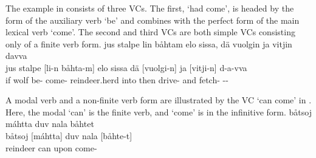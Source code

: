 The example in  consists of three VCs. The first,  ‘had come’, is headed by the  form of the auxiliary verb  ‘be’ and combines with the perfect form of the main lexical verb  ‘come’. The second and third VCs are both simple VCs consisting only of a finite verb form.
\ea\label{VCex4}
\glll	jus stalpe lin båhtam elo sissa, dä vuolgin ja vitjin davva\\
	jus stalpe [li-n {båhta-m]\subVC{}} elo sissa dä {[vuolgi-n]\subVC{}} ja {[vitji-n]\subVC{}} d-a-vva\\
	if wolf\BS{} be- come- reindeer.herd\BS{} into then drive- and fetch- --\\\nopagebreak
{}	
\z

A modal verb %
and a non-finite verb form are illustrated by the VC  ‘can come’ in . Here, the modal  ‘can’ is the finite verb, and  ‘come’ is in the infinitive form. 
\ea\label{VCex5}
\glll	båtsoj máhtta duv nala båhtet\\
	båtsoj {[máhtta]\subVC} duv nala {[båhte-t]\subVC}\\
	reindeer\BS{} can\BS{}  upon come-\\\nopagebreak
{}	
\z

